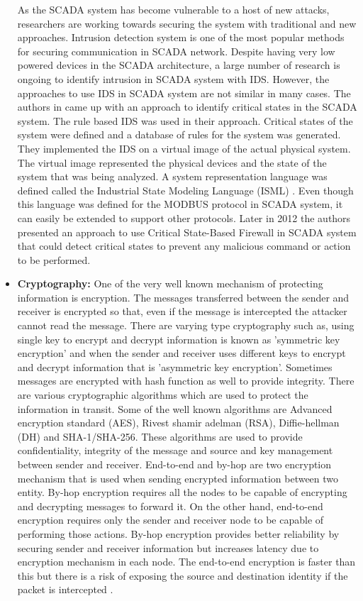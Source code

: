 \documentclass[letterpaper, 10 pt, conference]{ieeeconf}  %
\begin{document}
\begin{itemize}
As the SCADA system has become vulnerable to a host of new attacks, researchers are working towards securing the system with traditional and new approaches. Intrusion detection system is one of the most popular methods for securing communication in SCADA network. Despite having very low powered devices in the SCADA architecture, a large number of research is ongoing to identify intrusion in SCADA system with IDS. However, the approaches to use IDS in SCADA system are not similar in many cases. The authors in \cite{c2} came up with an approach to identify critical states in the SCADA system. The rule based IDS was used in their approach. Critical states of the system were defined and a database of rules for the system was generated. They implemented the IDS on a virtual image of the actual physical system. The virtual image represented the physical devices and the state of the system that was being analyzed. A system representation language was defined called the Industrial State Modeling Language (ISML) \cite{c1}. Even though this language was defined for the MODBUS protocol in SCADA system, it can easily  be extended to support other protocols. Later in 2012 the authors presented an approach to use Critical State-Based Firewall \cite{c3} in SCADA system that could detect critical states to prevent any malicious command or action to be performed.
\item \textbf{Cryptography: }One of the very well known mechanism of protecting information is encryption. The messages transferred between the sender and receiver is encrypted so that, even if the message is intercepted the attacker cannot read the message. There are varying type cryptography such as, using single key to encrypt and decrypt information is known as 'symmetric key encryption' and when the sender and receiver uses different keys to encrypt and decrypt information that is 'asymmetric key encryption'. Sometimes messages are encrypted with hash function as well to provide integrity. There are various cryptographic algorithms which are used to protect the information in transit. Some of the well known algorithms are Advanced encryption standard (AES), Rivest shamir adelman (RSA), Diffie-hellman (DH) and SHA-1/SHA-256. These algorithms are used to provide confidentiality, integrity of the message and source and key management between sender and receiver. 
End-to-end and by-hop are two encryption mechanism that is used when sending encrypted information between two entity. By-hop encryption requires all the nodes to be capable of encrypting and decrypting messages to forward it. On the other hand, end-to-end encryption requires only the sender and receiver node to be capable of performing those actions. By-hop encryption provides better reliability by securing sender and receiver information but increases latency due to encryption mechanism in each node. The end-to-end encryption is faster than this but there is a risk of exposing the source and destination identity if the packet is intercepted \cite{c17}.

\end{itemize}
\end{document}
